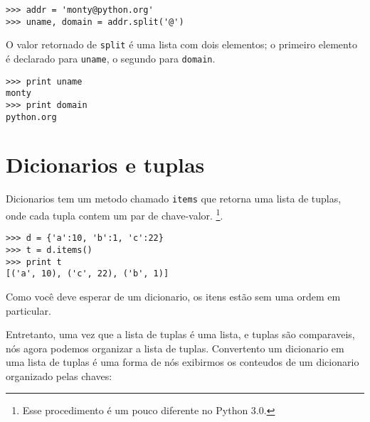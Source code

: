 
\beforeverb
\begin{verbatim}
>>> addr = 'monty@python.org'
>>> uname, domain = addr.split('@')
\end{verbatim}
\afterverb
%
O valor retornado de {\tt split} é uma lista com dois elementos;
o primeiro elemento é declarado para {\tt uname}, o segundo para
{\tt domain}.

\beforeverb
\begin{verbatim}
>>> print uname
monty
>>> print domain
python.org
\end{verbatim}
\afterverb
%

\section{Dicionarios e tuplas}


Dicionarios tem um metodo chamado {\tt items} que retorna uma lista de
tuplas, onde cada tupla contem um par de chave-valor.
\footnote{Esse procedimento é um pouco diferente no Python 3.0.}.

\beforeverb
\begin{verbatim}
>>> d = {'a':10, 'b':1, 'c':22}
>>> t = d.items()
>>> print t
[('a', 10), ('c', 22), ('b', 1)]
\end{verbatim}
\afterverb
%
Como você deve esperar de um dicionario, os itens estão sem
uma ordem em particular.

Entretanto, uma vez que a lista de tuplas é uma lista, e tuplas são comparaveis,
nós agora podemos organizar a lista de tuplas. Convertento um dicionario
em uma lista de tuplas é uma forma de nós exibirmos os conteudos de um
dicionario organizado pelas chaves:

